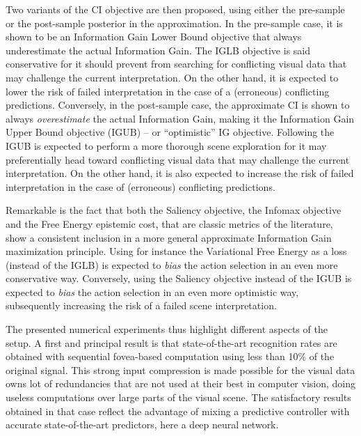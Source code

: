 \documentclass[12pt,twoside,openright]{article}
\begin{document}
Two variants of the CI objective are then proposed, using either the pre-sample or the post-sample posterior in the approximation. In the pre-sample case, it is shown to be an Information Gain Lower Bound objective that always underestimate the actual Information Gain. The IGLB objective is  said conservative for it should prevent from searching for conflicting visual data that may challenge the current interpretation. On the other hand, it is expected to lower the risk of failed interpretation in the case of a (erroneous) conflicting predictions.
Conversely, in the post-sample case, the approximate CI is shown to always \emph{overestimate} the actual Information Gain, 
making it the Information Gain Upper Bound objective (IGUB) -- or ``optimistic'' IG objective. Following the IGUB is expected to perform a more thorough scene exploration for it may preferentially head toward conflicting visual data that may challenge the current interpretation. On the other hand, it is also expected to increase the risk of failed interpretation in the case of (erroneous) conflicting predictions. 

Remarkable is the fact that both the Saliency objective, the Infomax  objective and the Free Energy epistemic cost, that are classic metrics of the literature,  show a consistent inclusion in a more general approximate Information Gain maximization principle.  Using for instance the Variational Free Energy \citep{friston2015active} as a loss (instead of the IGLB) is expected to \emph{bias} the action selection in an even more conservative way. Conversely, using the Saliency objective \citep{itti2005bayesian} instead of the IGUB is  expected to \emph{bias} the action selection in an even more optimistic way, subsequently increasing the risk of a failed scene interpretation.

The presented numerical experiments thus highlight different aspects of the setup. 
A first and principal result is that state-of-the-art recognition rates are obtained with sequential fovea-based computation using less than 10\% of the original signal. This strong input compression is made possible for the visual data owns lot of redundancies that are not used at their best in computer vision, doing useless computations over large parts of the visual scene. The satisfactory results obtained in that case reflect the advantage of mixing a predictive controller with accurate state-of-the-art predictors, here a deep neural network. 
\end{document}
